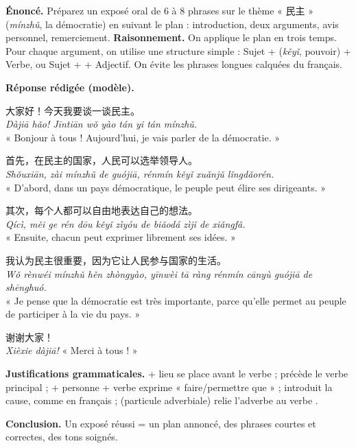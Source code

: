 \documentclass[11pt]{article}
\newcommand{\zh}[1]{\ifmmode\text{#1}\else{#1}\fi}
\begin{document}
\begin{exoresolu}
\textbf{Énoncé.} Préparez un exposé oral de 6 à 8 phrases sur le thème « 民主 » (\emph{mínzhǔ}, la démocratie) en suivant le plan : introduction, deux arguments, avis personnel, remerciement.
\tcblower
\textbf{Raisonnement.} On applique le plan en trois temps. Pour chaque argument, on utilise une structure simple : Sujet + \zh{可以} (\emph{kěyǐ}, pouvoir) + Verbe, ou Sujet + \zh{很} + Adjectif. On évite les phrases longues calquées du français.

\textbf{Réponse rédigée (modèle).}

大家好！今天我要谈一谈民主。\\
\emph{Dàjiā hǎo! Jīntiān wǒ yào tán yi tán mínzhǔ.}\\
« Bonjour à tous ! Aujourd'hui, je vais parler de la démocratie. »

首先，在民主的国家，人民可以选举领导人。\\
\emph{Shǒuxiān, zài mínzhǔ de guójiā, rénmín kěyǐ xuǎnjǔ lǐngdǎorén.}\\
« D'abord, dans un pays démocratique, le peuple peut élire ses dirigeants. »

其次，每个人都可以自由地表达自己的想法。\\
\emph{Qícì, měi ge rén dōu kěyǐ zìyóu de biǎodá zìjǐ de xiǎngfǎ.}\\
« Ensuite, chacun peut exprimer librement ses idées. »

我认为民主很重要，因为它让人民参与国家的生活。\\
\emph{Wǒ rènwéi mínzhǔ hěn zhòngyào, yīnwèi tā ràng rénmín cānyù guójiā de shēnghuó.}\\
« Je pense que la démocratie est très importante, parce qu'elle permet au peuple de participer à la vie du pays. »

谢谢大家！\\
\emph{Xièxie dàjiā!} « Merci à tous ! »

\textbf{Justifications grammaticales.} \zh{在} + lieu se place avant le verbe ; \zh{可以} précède le verbe principal ; \zh{让} + personne + verbe exprime « faire/permettre que » ; \zh{因为} introduit la cause, comme en français ; \zh{地} (particule adverbiale) relie l'adverbe \zh{自由} au verbe \zh{表达}.

\textbf{Conclusion.} Un exposé réussi = un plan annoncé, des phrases courtes et correctes, des tons soignés.
\end{exoresolu}
\end{document}
